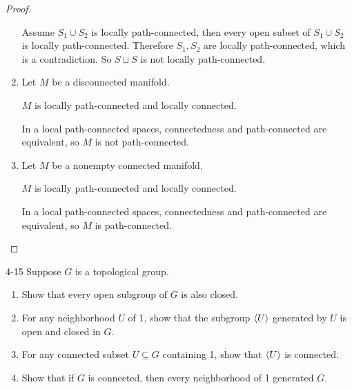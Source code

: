 \begin{proof}
\begin{enumerate}[label={(\alph*)}]
		      Assume $S_{1}\cup S_{2}$ is locally path-connected, then every open subset of $S_{1}\cup S_{2}$ is locally path-connected. Therefore $S_{1}, S_{2}$ are locally path-connected, which is a contradiction. So $S\sqcup S$ is not locally path-connected.
		\item Let $M$ be a disconnected manifold.

		      $M$ is locally path-connected and locally connected.

		      In a local path-connected spaces, connectedness and path-connected are equivalent, so $M$ is not path-connected.
		\item Let $M$ be a nonempty connected manifold.

		      $M$ is locally path-connected and locally connected.

		      In a local path-connected spaces, connectedness and path-connected are equivalent, so $M$ is path-connected.
	\end{enumerate}
\end{proof}

\begin{problem}{4-15}
Suppose $G$ is a topological group.
\begin{enumerate}[label={(\alph*)}]
	\item Show that every open subgroup of $G$ is also closed.
	\item For any neighborhood $U$ of 1, show that the subgroup $\left\langle{U}\right\rangle$ generated by $U$ is open and closed in $G$.
	\item For any connected subset $U\subseteq G$ containing 1, show that $\left\langle{U}\right\rangle$ is connected.
	\item Show that if $G$ is connected, then every neighborhood of 1 generated $G$.
\end{enumerate}
\end{problem}

